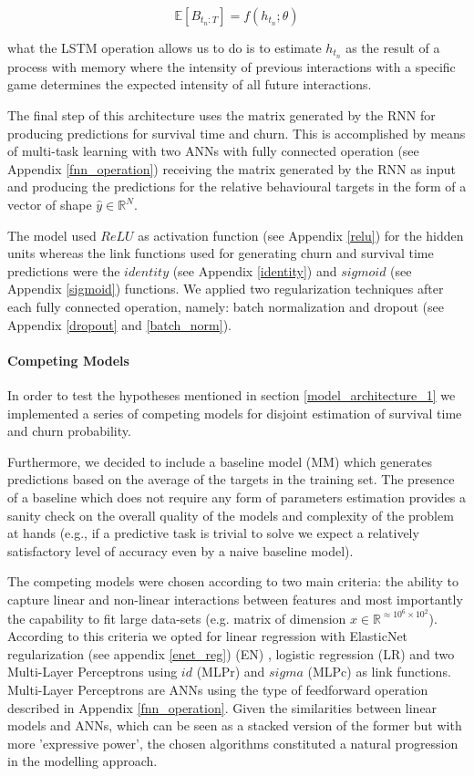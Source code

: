 \begin{equation}
\label{rnn_1_exp}
   \mathbb{E}[B_{t_n : T}] = f(h_{t_n}; \theta)
\end{equation}

what the LSTM operation allows us to do is to estimate $h_{t_n}$ as the result of a process with memory where the intensity of previous interactions with a specific game determines the expected intensity of all future interactions. 

The final step of this architecture uses the matrix generated by the RNN for producing predictions for survival time and churn. This is accomplished by means of multi-task learning with two ANNs with fully connected operation (see Appendix \ref{fnn_operation}) receiving the matrix generated by the RNN as input and producing the predictions for the relative behavioural targets in the form of a vector of shape $\hat{y} \in \mathbb{R}^{N}$. 

The model used $ReLU$ as activation function (see Appendix \ref{relu}) for the hidden units whereas the link functions used for generating churn and survival time predictions were the $identity$ (see Appendix \ref{identity}) and $sigmoid$ (see Appendix \ref{sigmoid}) functions. We applied two regularization techniques after each fully connected operation, namely: batch normalization \cite{ioffe2015batch} and dropout \cite{srivastava2014dropout} (see Appendix \ref{dropout} and \ref{batch_norm}).

\paragraph*{Competing Models}
\label{competing_models_1}
In order to test the hypotheses mentioned in section \ref{model_architecture_1} we implemented a series of competing models for disjoint estimation of survival time and churn probability. 

Furthermore, we decided to include a baseline model (MM) which generates predictions based on the average of the targets in the training set. The presence of a baseline which does not require any form of parameters estimation provides a sanity check on the overall quality of the models and complexity of the problem at hands (e.g., if a  predictive task is trivial to solve we expect a relatively satisfactory level of accuracy even by a naive baseline model). 

The competing models were chosen according to two main criteria: the ability to capture linear and non-linear interactions between features and most importantly the capability to fit large data-sets (e.g. matrix of dimension $x \in \mathbb{R}^{\approx10^6\times10^2}$). According to this criteria we opted for linear regression with ElasticNet regularization (see appendix \ref{enet_reg}) (EN) \cite{zou2005regularization}, logistic regression (LR) and two Multi-Layer Perceptrons using  $id$ (MLPr) and $sigma$ (MLPc) as link functions. Multi-Layer Perceptrons are ANNs using the type of feedforward operation described in Appendix \ref{fnn_operation}. Given the similarities between linear models and ANNs, which can be seen as a stacked version of the former but with more 'expressive power', the chosen algorithms constituted a natural progression in the modelling approach. 

